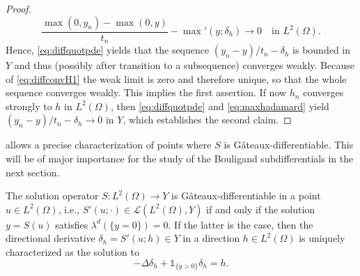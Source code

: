 \documentclass[reqno]{shinyart}
\begin{document}
\begin{proof}
\begin{equation}
        \frac{\max(0,y_n) - \max(0,y)}{t_n} - {\max\nolimits}'(y;\delta_h) \to 0 
        \quad \text{in }L^2(\Omega).
    \end{equation}
    Hence, \eqref{eq:diffquotpde} yields that the sequence $(y_n - y)/t_n - \delta_h$ is bounded in $Y$ 
    and thus (possibly after transition to a subsequence) converges weakly. 
    Because of \eqref{eq:diffconvH1} the weak limit is zero and therefore unique, so that the whole 
    sequence converges weakly. This implies the first assertion. 
    If now $h_n$ converges strongly to $h$ in $L^2(\Omega)$, then \eqref{eq:diffquotpde} and 
    \eqref{eq:maxhadamard} yield $(y_n - y)/t_n - \delta_h \to 0$ in $Y$, 
    which establishes the second claim.
\end{proof}
 allows a precise characterization of points where $S$ is G\^ateaux-differentiable. 
This will be of major importance for the study of the Bouligand subdifferentials in the next section.

\begin{corollary}\label{cor:GateauxCrit}
    The solution operator $S : L^2(\Omega) \to Y$ is G\^ateaux-differentiable 
    in a point $u \in L^2(\Omega)$, i.e., $S'(u; \cdot) \in  \mathcal{L}(L^2(\Omega), Y)$ 
    if and only if the solution $y = S(u)$ satisfies $\lambda^d(\{y =0\}) = 0$. 
    If the latter is the case, then the directional derivative $\delta_h = S'(u; h) \in Y$ 
    in a direction $h \in L^2(\Omega)$  is uniquely characterized as the solution to
    \begin{equation}\label{eq:gateauxpde}
        - \Delta \delta_h + \mathbb{1}_{\{y >0\}} \delta_h = h.
    \end{equation}
\end{corollary}
\end{document}

